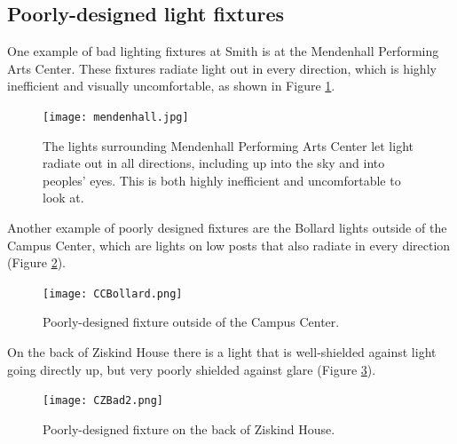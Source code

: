 \documentclass[12pt, oneside]{article}
\begin{document}
\subsection{Poorly-designed light fixtures}
One example of bad lighting fixtures at Smith is at the Mendenhall Performing Arts Center. These fixtures radiate light out in every direction, which is highly inefficient and visually uncomfortable, as shown in Figure \ref{Mendenhall}.
\begin{figure}[p]
	\centering
	\texttt{[image: mendenhall.jpg]}
	\caption[Mendenhall Performing Arts Center lighting]{The lights surrounding Mendenhall Performing Arts Center let light radiate out in all directions, including up into the sky and into peoples' eyes. This is both highly inefficient and uncomfortable to look at.}
	\label{Mendenhall}
\end{figure}  
Another example of poorly designed fixtures are the Bollard lights outside of the Campus Center, which are lights on low posts that also radiate in every direction (Figure \ref{Bollard}).
 \begin{figure}[p]
	\centering
	\texttt{[image: CCBollard.png]}
	\caption[Light outside of Campus Center]{Poorly-designed fixture outside of the Campus Center.}
	\label{Bollard}
\end{figure}
On the back of Ziskind House there is a light that is well-shielded against light going directly up, but very poorly shielded against glare (Figure \ref{CZbad}).
 \begin{figure}[p]
	\centering
	\texttt{[image: CZBad2.png]}
	\caption[Light on Ziskind House]{Poorly-designed fixture on the back of Ziskind House.}
	\label{CZbad}
\end{figure}
\end{document}

